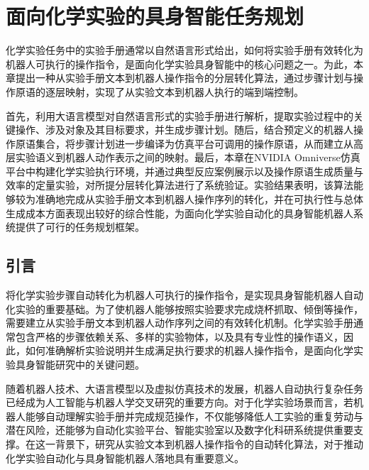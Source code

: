 

\chapter{面向化学实验的具身智能任务规划}
\label{chap:robot_exec}

化学实验任务中的实验手册通常以自然语言形式给出，如何将实验手册有效转化为机器人可执行的操作指令，是面向化学实验具身智能中的核心问题之一。为此，本章提出一种从实验手册文本到机器人操作指令的分层转化算法，通过步骤计划与操作原语的逐层映射，实现了从实验文本到机器人执行的端到端控制。

首先，利用大语言模型对自然语言形式的实验手册进行解析，提取实验过程中的关键操作、涉及对象及其目标要求，并生成步骤计划。随后，结合预定义的机器人操作原语集合，将步骤计划进一步编译为仿真平台可调用的操作原语，从而建立从高层实验语义到机器人动作表示之间的映射。最后，本章在NVIDIA Omniverse仿真平台中构建化学实验执行环境，并通过典型反应案例展示以及操作原语生成质量与效率的定量实验，对所提分层转化算法进行了系统验证。实验结果表明，该算法能够较为准确地完成从实验手册文本到机器人操作序列的转化，并在可执行性与总体生成成本方面表现出较好的综合性能，为面向化学实验自动化的具身智能机器人系统提供了可行的任务规划框架。


\section{引言}


将化学实验步骤自动转化为机器人可执行的操作指令，是实现具身智能机器人自动化实验的重要基础。为了使机器人能够按照实验要求完成烧杯抓取、倾倒等操作，需要建立从实验手册文本到机器人动作序列之间的有效转化机制。化学实验手册通常包含严格的步骤依赖关系、多样的实验物体，以及具有专业性的操作语义，因此，如何准确解析实验说明并生成满足执行要求的机器人操作指令，是面向化学实验具身智能研究中的关键问题。

随着机器人技术、大语言模型以及虚拟仿真技术的发展，机器人自动执行复杂任务已经成为人工智能与机器人学交叉研究的重要方向。对于化学实验场景而言，若机器人能够自动理解实验手册并完成规范操作，不仅能够降低人工实验的重复劳动与潜在风险，还能够为自动化实验平台、智能实验室以及数字化科研系统提供重要支撑。在这一背景下，研究从实验文本到机器人操作指令的自动转化算法，对于推动化学实验自动化与具身智能机器人落地具有重要意义。

